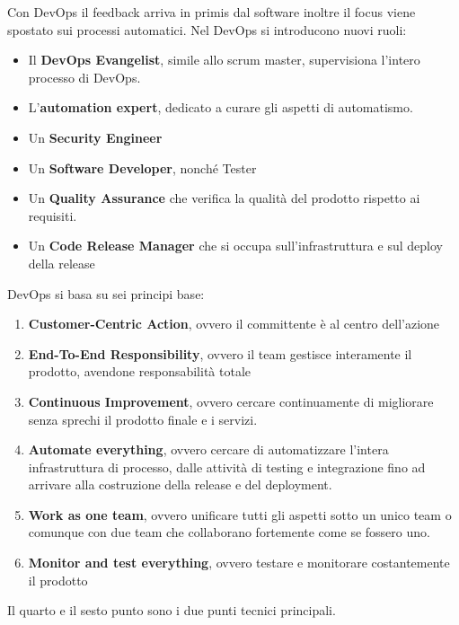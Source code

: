 Con DevOps il feedback arriva in primis dal software inoltre il focus viene
spostato sui processi automatici. Nel DevOps si introducono nuovi ruoli:
\begin{itemize}
      \item Il \textbf{DevOps Evangelist}, simile allo scrum master, supervisiona
            l'intero processo di DevOps.
      \item L'\textbf{automation expert}, dedicato a curare gli aspetti di
            automatismo.
      \item Un \textbf{Security Engineer}
      \item Un \textbf{Software Developer}, nonché Tester
      \item Un \textbf{Quality Assurance} che verifica la qualità del prodotto
            rispetto ai requisiti.
      \item Un\textbf{ Code Release Manager} che si occupa sull'infrastruttura e
            sul deploy della release
\end{itemize}
DevOps si basa su sei principi base:
\begin{enumerate}
    \item \textbf{Customer-Centric Action}, ovvero il committente è al centro
          dell'azione
    \item \textbf{End-To-End Responsibility}, ovvero il team gestisce interamente
          il prodotto, avendone responsabilità totale
    \item \textbf{Continuous Improvement}, ovvero cercare continuamente di
          migliorare senza sprechi il prodotto finale e i servizi.
    \item \textbf{Automate everything}, ovvero cercare di automatizzare l'intera
          infrastruttura di processo, dalle attività di testing e integrazione fino ad
          arrivare alla costruzione della release e del deployment.
    \item \textbf{Work as one team}, ovvero unificare tutti gli aspetti sotto un
          unico team o comunque con due team che collaborano fortemente come se fossero uno.
    \item \textbf{Monitor and test everything}, ovvero testare e monitorare
          costantemente il prodotto
\end{enumerate}
Il quarto e il sesto punto sono i due punti tecnici principali.
